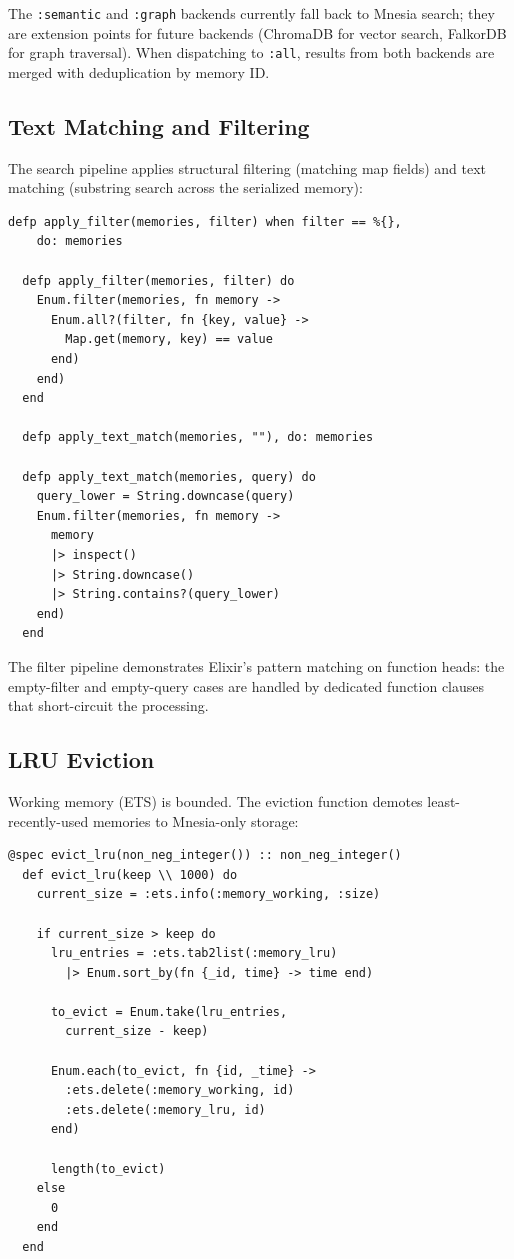 \documentclass[12pt,a4paper]{article}
\theoremstyle{definition}
\begin{document}
The \texttt{:semantic} and \texttt{:graph} backends currently fall back to Mnesia search; they are extension points for future backends (ChromaDB for vector search, FalkorDB for graph traversal).
When dispatching to \texttt{:all}, results from both backends are merged with deduplication by memory ID.

\subsection{Text Matching and Filtering}\label{subsec:text-matching}

The search pipeline applies structural filtering (matching map fields) and text matching (substring search across the serialized memory):

\begin{lstlisting}[caption={Filter and text-match pipeline.}, label={lst:filter-pipeline}]
  defp apply_filter(memories, filter) when filter == %{},
    do: memories

  defp apply_filter(memories, filter) do
    Enum.filter(memories, fn memory ->
      Enum.all?(filter, fn {key, value} ->
        Map.get(memory, key) == value
      end)
    end)
  end

  defp apply_text_match(memories, ""), do: memories

  defp apply_text_match(memories, query) do
    query_lower = String.downcase(query)
    Enum.filter(memories, fn memory ->
      memory
      |> inspect()
      |> String.downcase()
      |> String.contains?(query_lower)
    end)
  end
\end{lstlisting}

The filter pipeline demonstrates Elixir's pattern matching on function heads: the empty-filter and empty-query cases are handled by dedicated function clauses that short-circuit the processing.

\subsection{LRU Eviction}\label{subsec:lru-eviction}

Working memory (ETS) is bounded.
The eviction function demotes least-recently-used memories to Mnesia-only storage:

\begin{lstlisting}[caption={LRU eviction from working memory.}, label={lst:eviction}]
  @spec evict_lru(non_neg_integer()) :: non_neg_integer()
  def evict_lru(keep \\ 1000) do
    current_size = :ets.info(:memory_working, :size)

    if current_size > keep do
      lru_entries = :ets.tab2list(:memory_lru)
        |> Enum.sort_by(fn {_id, time} -> time end)

      to_evict = Enum.take(lru_entries,
        current_size - keep)

      Enum.each(to_evict, fn {id, _time} ->
        :ets.delete(:memory_working, id)
        :ets.delete(:memory_lru, id)
      end)

      length(to_evict)
    else
      0
    end
  end
\end{lstlisting}
\end{document}
